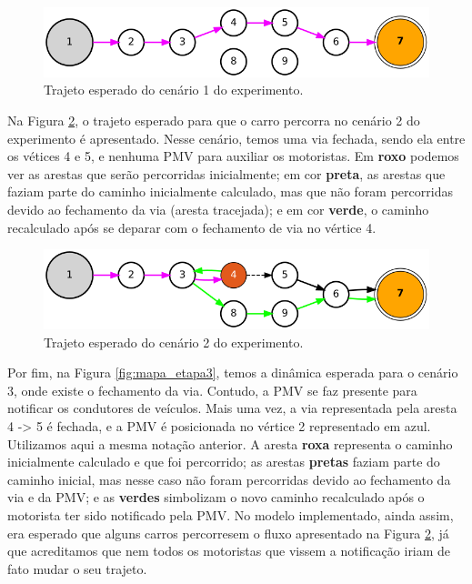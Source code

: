 \begin{figure}[ht]
	\centering
	\includegraphics[width=\textwidth]{figuras/mapa_etapa1.png}
	\caption{Trajeto esperado do cenário 1 do experimento.}
	\label{fig:mapa_etapa1}
\end{figure}

Na Figura \ref{fig:mapa_etapa2}, o trajeto esperado para que o carro percorra no cenário 2 do experimento é apresentado.
Nesse cenário, temos uma via fechada, sendo ela entre os vétices 4 e 5, e nenhuma PMV para auxiliar os motoristas.
Em \textbf{roxo} podemos ver as arestas que serão percorridas inicialmente;
em cor \textbf{preta}, as arestas que faziam parte do caminho inicialmente calculado, mas que não foram percorridas devido ao fechamento da via (aresta tracejada);
e em cor \textbf{verde}, o caminho recalculado após se deparar com o fechamento de via no vértice 4.

\begin{figure}[ht]
	\centering
	\includegraphics[width=\textwidth]{figuras/mapa_etapa2.png}
	\caption{Trajeto esperado do cenário 2 do experimento.}
	\label{fig:mapa_etapa2}
\end{figure}

Por fim, na Figura \ref{fig:mapa_etapa3}, temos a dinâmica esperada para o cenário 3, onde existe o fechamento da via. Contudo, a PMV se faz presente para notificar os condutores de veículos.
Mais uma vez, a via representada pela aresta 4 -> 5 é fechada, e a PMV é posicionada no vértice 2 representado em azul.
Utilizamos aqui a mesma notação anterior.
A aresta \textbf{roxa} representa o caminho inicialmente calculado e que foi percorrido;
as arestas \textbf{pretas} faziam parte do caminho inicial, mas nesse caso não foram percorridas devido ao fechamento da via e da PMV;
e as \textbf{verdes} simbolizam o novo caminho recalculado após o motorista ter sido notificado pela PMV.
No modelo implementado, ainda assim, era esperado que alguns carros percorresem o fluxo apresentado na Figura \ref{fig:mapa_etapa2}, já que acreditamos que nem todos os motoristas que vissem
a notificação iriam de fato mudar o seu trajeto.

